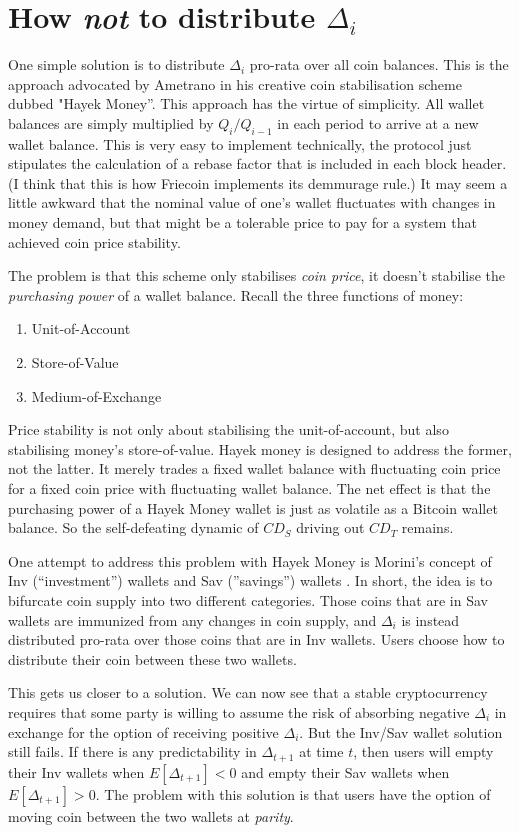 \documentclass[twocolumn]{article}
\begin{document}
\section*{How \emph{not} to distribute $\Delta_{i}$}
One simple solution is to distribute $\Delta_{i}$ pro-rata over all
coin balances. This is the approach advocated by Ametrano in his
creative coin stabilisation scheme dubbed "Hayek
Money''\cite{ametrano}. This approach has the virtue of
simplicity. All wallet balances are simply multiplied by $Q_{i} /
Q_{i-1}$ in each period to arrive at a new wallet balance. This is
very easy to implement technically, the protocol just stipulates the
calculation of a rebase factor that is included in each block
header. (I think that this is how Friecoin implements its demmurage
rule.) It may seem a little awkward that the nominal value of one's
wallet fluctuates with changes in money demand, but that might be a
tolerable price to pay for a system that achieved coin price stability.

The problem is that this scheme only stabilises \emph{coin price}, it
doesn't stabilise the \emph{purchasing power} of a wallet
balance. Recall the three functions of money:
\begin{enumerate}
\item Unit-of-Account
\item Store-of-Value
\item Medium-of-Exchange
\end{enumerate}
Price stability is not only about stabilising the unit-of-account, but
also stabilising money's store-of-value. Hayek money is designed to
address the former, not the latter. It merely trades a fixed wallet
balance with fluctuating coin price for a fixed coin price with
fluctuating wallet balance. The net effect is that the purchasing
power of a Hayek Money wallet is just as volatile as a Bitcoin wallet
balance. So the self-defeating dynamic of $CD_{S}$ driving out
$CD_{T}$ remains.

One attempt to address this problem with Hayek Money is Morini's
concept of Inv (``investment'') wallets and Sav (''savings'') wallets
\cite{morini}. In short, the idea is to bifurcate coin supply into two
different categories. Those coins that are in Sav wallets are
immunized from any changes in coin supply, and $\Delta_{i}$ is instead
distributed pro-rata over those coins that are in Inv wallets. Users
choose how to distribute their coin between these two wallets. 

This gets us closer to a solution. We can now see that a stable
cryptocurrency requires that some party is willing to assume the risk
of absorbing negative $\Delta_{i}$ in exchange for the option of
receiving positive $\Delta_{i}$. But the Inv/Sav wallet solution still
fails. If there is any predictability in $\Delta_{t+1}$ at time $t$,
then users will empty their Inv wallets when $E[\Delta_{t+1}]<0$ and
empty their Sav wallets when $E[\Delta_{t+1}]>0$. The problem with
this solution is that users have the option of moving coin between the
two wallets at \emph{parity}.
\end{document}
